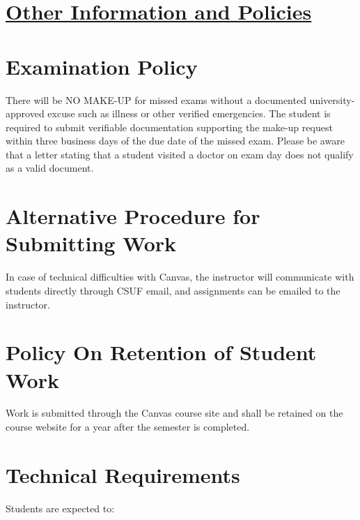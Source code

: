 \documentclass{syllabus}
\begin{document}
{%

\newpage
\section*{\centering \underline{Other Information and Policies}} \vspace{1em}
\section*{Examination Policy}
There will be NO MAKE-UP for missed exams without a documented university-approved excuse such as illness or other verified emergencies. The student is required to submit verifiable documentation supporting the make-up request within three business days of the due date of the missed exam. Please be aware that a letter stating that a student visited a doctor on exam day does not qualify as a valid document.

\section*{Alternative Procedure for Submitting Work}
In case of technical difficulties with Canvas, the instructor will communicate with students directly through CSUF email, and assignments can be emailed to the instructor.

\section*{Policy On Retention of Student Work}
Work is submitted through the Canvas course site and shall be retained on the course website for a year after the semester is completed.

\section*{Technical Requirements}
Students are expected to:

}
\end{document}
